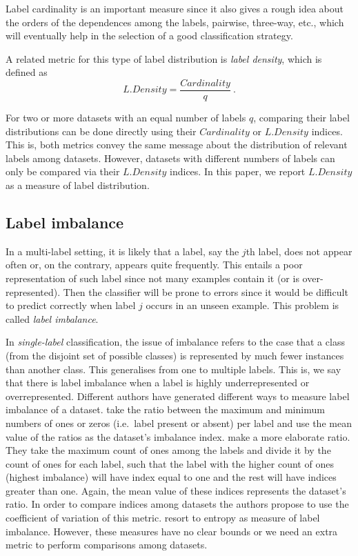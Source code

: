 \documentclass[review]{elsarticle}
\begin{document}
Label cardinality is an important measure since it also gives a rough idea about the orders of the dependences among the labels, pairwise, three-way, etc., which will eventually help in the selection of a good classification strategy.

A related metric for this type of label distribution is \emph{label density}, which is defined as~\citep{Tsoumakas:07,Gibaja:15}
\begin{equation}
L.Density = \frac{Cardinality}{q}\ .
\end{equation}

For two or more datasets with an equal number of labels $q$, comparing their label distributions can be done directly using their $Cardinality$ or $L.Density$ indices. This is, both metrics convey the same message about the distribution of relevant labels among datasets. However, datasets with different numbers of labels can only be compared via their $L.Density$ indices. In this paper, we report $L.Density$ as a measure of label distribution.

\subsection{Label imbalance}

In a multi-label setting, it is likely that a label, say the $j$th label, does not appear often or, on the contrary, appears quite frequently. This entails a poor representation of such label since not many examples contain it (or is over-represented). Then the classifier will be prone to errors since it would be difficult to predict correctly when label $j$ occurs in an unseen example. This problem is called \emph{label imbalance}.

In \emph{single-label} classification, the issue of imbalance refers to the case that a class (from the disjoint set of possible classes) is represented by much fewer instances than another class. This generalises from one to multiple labels. This is, we say that there is label imbalance when a label is highly underrepresented or overrepresented. Different authors have generated different ways to measure label imbalance of a dataset. \citet{LIEG1} take the ratio between the maximum and minimum numbers of ones or zeros (i.e.~label present or absent) per label and use the mean value of the ratios as the dataset's imbalance index. \citet{LIEG2} make a more elaborate ratio. They take the maximum count of ones among the labels and divide it by the count of ones for each label, such that the label with the higher count of ones (highest imbalance) will have index equal to one and the rest will have indices greater than one. Again, the mean value of these indices represents the dataset's ratio. In order to compare indices among datasets the authors propose to use the coefficient of variation of this metric. \citet{LIEG3} resort to entropy as measure of label imbalance. However, these measures have no clear bounds or we need an extra metric to perform comparisons among datasets.
\end{document}
